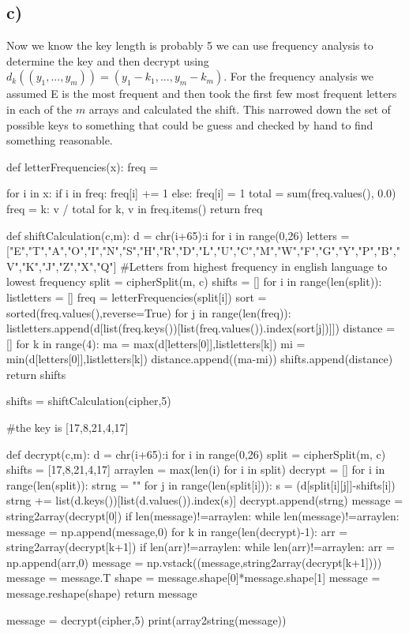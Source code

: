 \documentclass{article}
\begin{document}
\subsection*{c)}
Now we know the key length is probably 5 we can use frequency analysis to determine the key and then decrypt using $d_{k}((y_1,...,y_m))=(y_1-k_1,...,y_m-k_m)$. For the frequency analysis we assumed E is the most frequent and then took the first few most frequent letters in each of the $m$ arrays and calculated the shift. This narrowed down the set of possible keys to something that could be guess and checked by hand to find something reasonable.
\begin{python}
def letterFrequencies(x):
    freq = {}
 
    for i in x:
        if i in freq:
            freq[i] += 1
        else:
            freq[i] = 1
    total = sum(freq.values(), 0.0)
    freq = {k: v / total for k, v in freq.items()}
    return freq
    
def shiftCalculation(c,m):
    d = {chr(i+65):i for i in range(0,26)}
    letters = ["E","T","A","O","I","N","S","H","R","D","L","U","C","M","W","F","G","Y","P","B","V","K","J","Z","X","Q"] #Letters from highest frequency in english language to lowest frequency
    split = cipherSplit(m, c)
    shifts = []
    for i in range(len(split)):
        listletters = []
        freq = letterFrequencies(split[i])
        sort = sorted(freq.values(),reverse=True)
        for j in range(len(freq)):
            listletters.append(d[list(freq.keys())[list(freq.values()).index(sort[j])]])
        distance = []
        for k in range(4):
            ma = max(d[letters[0]],listletters[k])
            mi = min(d[letters[0]],listletters[k])
            distance.append((ma-mi))
        shifts.append(distance)
    return shifts

shifts = shiftCalculation(cipher,5)

#the key is [17,8,21,4,17]

def decrypt(c,m):
    d = {chr(i+65):i for i in range(0,26)}
    split = cipherSplit(m, c)
    shifts = [17,8,21,4,17]
    arraylen = max(len(i) for i in split)
    decrypt = []
    for i in range(len(split)):
        strng = ""
        for j in range(len(split[i])):
            s = (d[split[i][j]]-shifts[i])%
            strng += list(d.keys())[list(d.values()).index(s)]
        decrypt.append(strng)
    message = string2array(decrypt[0])
    if len(message)!=arraylen:
        while len(message)!=arraylen:
            message = np.append(message,0)
    for k in range(len(decrypt)-1):
        arr = string2array(decrypt[k+1])
        if len(arr)!=arraylen:
            while len(arr)!=arraylen:
                arr = np.append(arr,0)
        message = np.vstack((message,string2array(decrypt[k+1])))
    message = message.T
    shape = message.shape[0]*message.shape[1]
    message = message.reshape(shape)
    return message


message = decrypt(cipher,5)
print(array2string(message))
\end{python}
\end{document}
